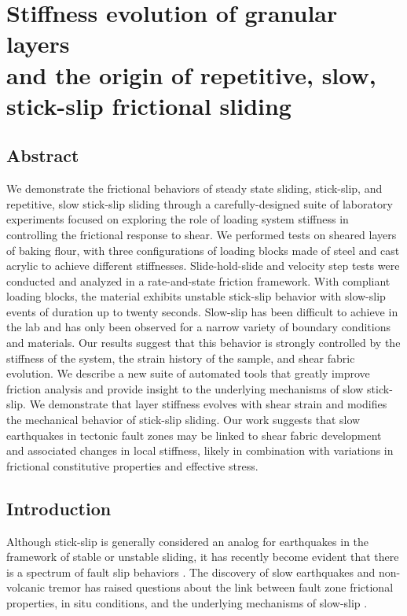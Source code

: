 \chapter{Stiffness evolution of granular layers \\and the origin of repetitive, slow, \\stick-slip frictional sliding}

\section{Abstract}
We demonstrate the frictional behaviors of steady state sliding, stick-slip, and
repetitive, slow stick-slip sliding through a carefully-designed suite of
laboratory experiments focused on exploring the role of loading system stiffness
in controlling the frictional response to shear. We performed tests on sheared
layers of baking flour, with three configurations of loading blocks made of
steel and cast acrylic to achieve different stiffnesses. Slide-hold-slide and
velocity step tests were conducted and analyzed in a rate-and-state friction
framework. With compliant loading blocks, the material exhibits unstable
stick-slip behavior with slow-slip events of duration up to twenty seconds.
Slow-slip has been difficult to achieve in the lab and has only been observed
for a narrow variety of boundary conditions and materials. Our results suggest
that this behavior is strongly controlled by the stiffness of the system, the
strain history of the sample, and shear fabric evolution. We describe a new
suite of automated tools that greatly improve friction analysis and provide
insight to the underlying mechanisms of slow stick-slip. We demonstrate that
layer stiffness evolves with shear strain and modifies the mechanical behavior
of stick-slip sliding. Our work suggests that slow earthquakes in tectonic fault
zones may be linked to shear fabric development and associated changes in local
stiffness, likely in combination with variations in frictional constitutive
properties and effective stress.

\section{Introduction}
Although stick-slip is generally considered an analog for earthquakes
\cite{Brace_Byerlee_1969,Johnson_2013} in the framework of stable or unstable
sliding, it has recently become evident that there is a spectrum of fault slip
behaviors \cite{Peng:2010il}.  The discovery of slow earthquakes and
non-volcanic tremor \cite{ikari2013slip,Beroza:2011jk,Obara:2002hp,Ide:2007fi}
has raised questions about the link between fault zone frictional properties, in
situ conditions, and the underlying mechanisms of slow-slip
\cite{Kaproth:2013jz}.

